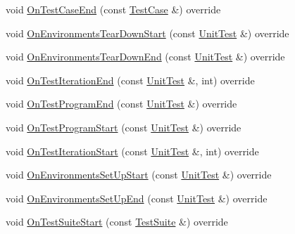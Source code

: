 \begin{DoxyCompactItemize}
\item 
void \mbox{\hyperlink{classtesting_1_1_empty_test_event_listener_abe05cc74c1081ed51e2c84b73013299e}{On\+Test\+Case\+End}} (const \mbox{\hyperlink{classtesting_1_1_test_case}{Test\+Case}} \&) override
\item 
void \mbox{\hyperlink{classtesting_1_1_empty_test_event_listener_a320780451eac9178434b7c77d948ecbd}{On\+Environments\+Tear\+Down\+Start}} (const \mbox{\hyperlink{classtesting_1_1_unit_test}{Unit\+Test}} \&) override
\item 
void \mbox{\hyperlink{classtesting_1_1_empty_test_event_listener_ad9984052e82c3ae26395a2d9480326d2}{On\+Environments\+Tear\+Down\+End}} (const \mbox{\hyperlink{classtesting_1_1_unit_test}{Unit\+Test}} \&) override
\item 
void \mbox{\hyperlink{classtesting_1_1_empty_test_event_listener_aae9c5c61e476f0c421402fb1dde434d2}{On\+Test\+Iteration\+End}} (const \mbox{\hyperlink{classtesting_1_1_unit_test}{Unit\+Test}} \&, int) override
\item 
void \mbox{\hyperlink{classtesting_1_1_empty_test_event_listener_aaa9d683e8e0c850af67a0b92d785ddb9}{On\+Test\+Program\+End}} (const \mbox{\hyperlink{classtesting_1_1_unit_test}{Unit\+Test}} \&) override
\item 
void \mbox{\hyperlink{classtesting_1_1_empty_test_event_listener_ac3f5033fcd82080edb45f546ce9854fe}{On\+Test\+Program\+Start}} (const \mbox{\hyperlink{classtesting_1_1_unit_test}{Unit\+Test}} \&) override
\item 
void \mbox{\hyperlink{classtesting_1_1_empty_test_event_listener_a31edf103561e8b4d747656bc2d927661}{On\+Test\+Iteration\+Start}} (const \mbox{\hyperlink{classtesting_1_1_unit_test}{Unit\+Test}} \&, int) override
\item 
void \mbox{\hyperlink{classtesting_1_1_empty_test_event_listener_a6e498ae763ac8c1a46bd861e0b7ff3f5}{On\+Environments\+Set\+Up\+Start}} (const \mbox{\hyperlink{classtesting_1_1_unit_test}{Unit\+Test}} \&) override
\item 
void \mbox{\hyperlink{classtesting_1_1_empty_test_event_listener_a9b4e781c0b38065a55c2fd163724ba69}{On\+Environments\+Set\+Up\+End}} (const \mbox{\hyperlink{classtesting_1_1_unit_test}{Unit\+Test}} \&) override
\item 
void \mbox{\hyperlink{classtesting_1_1_empty_test_event_listener_a1e32e4bd4857822b6b50e6900aa5c651}{On\+Test\+Suite\+Start}} (const \mbox{\hyperlink{classtesting_1_1_test_suite}{Test\+Suite}} \&) override
\item 

\end{DoxyCompactItemize}
